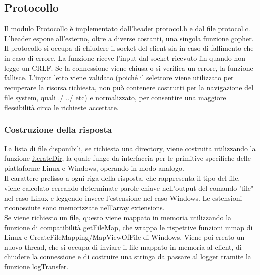 \documentclass{article}
\begin{document}
\subsection{Protocollo}

Il modulo Protocollo è implementato dall'header protocol.h e dal file protocol.c.
L'header espone all'esterno, oltre a diverse costanti, una singola funzione \href{}{gopher}.
Il protocollo si occupa di chiudere il socket del client sia in caso di fallimento che in caso di errore.
La funzione riceve l'input dal socket ricevuto fin quando non legge un CRLF.
Se la connessione viene chiusa o si verifica un errore, la funzione fallisce.
L'input letto viene validato (poiché il selettore viene utilizzato per recuperare la risorsa
richiesta, non può contenere costrutti per la navigazione del file system, quali ./ ../ etc) e normalizzato,
per consentire una maggiore flessibilità circa le richieste accettate.

\subsubsection{Costruzione della risposta}
La lista di file disponibili, se richiesta una directory, viene costruita utilizzando la funzione \href{}
{iterateDir}, la quale funge da interfaccia per le primitive specifiche delle piattaforme Linux e Windows,
operando in modo analogo.\\
Il carattere prefisso a ogni riga della risposta, che rappresenta il tipo del file, viene calcolato
cercando determinate parole chiave nell'output del comando "file" nel caso Linux e leggendo invece
l'estensione nel caso Windows. Le estensioni riconosciute sono memorizzate nell'array \href{}{extensions}.\\
Se viene richiesto un file, questo viene mappato in memoria utilizzando la funzione di 
compatibilità \href{}{getFileMap}, che wrappa le rispettive funzioni
mmap di Linux e CreateFileMapping/MapViewOfFile di Windows. Viene poi creato un nuovo thread, che si occupa di
inviare il file mappato in memoria al client, di chiudere la connessione e di costruire una stringa da passare al
logger tramite la funzione \href{}{logTransfer}.
\end{document}
